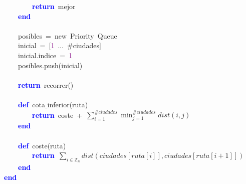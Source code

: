 \mbox{}\ \ \ \ \ \ \ \ \textbf{\textcolor{Blue}{return}}\ mejor \\
\mbox{}\ \ \ \ \textbf{\textcolor{Blue}{end}} \\
\mbox{} \\
\mbox{}\ \ \ \ posibles\ \textcolor{BrickRed}{=}\ new\ Priority\ Queue \\
\mbox{}\ \ \ \ inicial\ \textcolor{BrickRed}{=}\ \textcolor{BrickRed}{[}\textcolor{Purple}{1}\ \textcolor{BrickRed}{...}\ \#ciudades\textcolor{BrickRed}{]} \\
\mbox{}\ \ \ \ inicial\textcolor{BrickRed}{.}indice\ \textcolor{BrickRed}{=}\ \textcolor{Purple}{1} \\
\mbox{}\ \ \ \ posibles\textcolor{BrickRed}{.}push\textcolor{BrickRed}{(}inicial\textcolor{BrickRed}{)} \\
\mbox{} \\
\mbox{}\ \ \ \ \textbf{\textcolor{Blue}{return}}\ recorrer\textcolor{BrickRed}{()} \\
\mbox{} \\
\mbox{}\ \ \ \ \textbf{\textcolor{Blue}{def}}\ cota$\_$inferior\textcolor{BrickRed}{(}ruta\textcolor{BrickRed}{)} \\
\mbox{}\ \ \ \ \ \ \ \ \textbf{\textcolor{Blue}{return}}\ coste\ \textcolor{BrickRed}{+}\ $\sum_{i=1}^{\#ciudades} \min_{j=1}^{\#ciudades} dist(i,j)$ \\
\mbox{}\ \ \ \ \textbf{\textcolor{Blue}{end}} \\
\mbox{} \\
\mbox{}\ \ \ \ \textbf{\textcolor{Blue}{def}}\ coste\textcolor{BrickRed}{(}ruta\textcolor{BrickRed}{)} \\
\mbox{}\ \ \ \ \ \ \ \ \textbf{\textcolor{Blue}{return}}\ $\sum_{i \in \mathbb{Z}_n} dist(ciudades[ruta[i]], ciudades[ruta[i+1]])$ \\
\mbox{}\ \ \ \ \textbf{\textcolor{Blue}{end}} \\
\mbox{}\textbf{\textcolor{Blue}{end}} \\
\mbox{}
